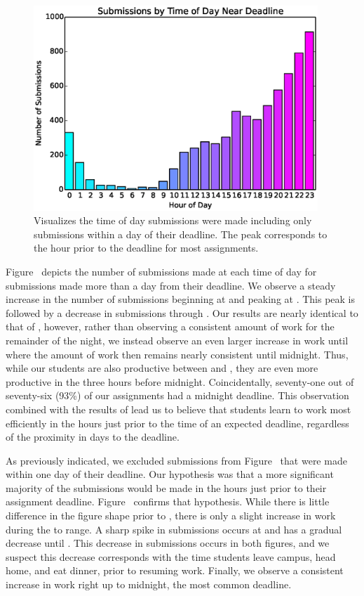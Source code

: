 \begin{figure}[!t]
\centering
\includegraphics[trim=0 .12in 0 .10in, clip, width=4.215in]{graphs/Submissions_by_Time_of_Day_Near_Deadline.eps}
\caption{Visualizes the time of day submissions were made including only
  submissions within a day of their deadline. The  peak corresponds to
  the hour prior to the deadline for most assignments.}
\end{figure}

Figure~ depicts the number of submissions made at
each time of day for submissions made more than a day from their deadline. We
observe a steady increase in the number of submissions beginning at  and
peaking at . This peak is followed by a decrease in submissions through
. Our results are nearly identical to that of \spacco{}, however, rather
than observing a consistent amount of work for the remainder of the night, we
instead observe an even larger increase in work until  where the amount
of work then remains nearly consistent until midnight. Thus, while our students
are also productive between  and , they are even more productive in
the three hours before midnight. Coincidentally, seventy-one out of seventy-six
(93\%) of our assignments had a midnight deadline. This observation combined
with the results of \spacco{} lead us to believe that students learn to work
most efficiently in the hours just prior to the time of an expected deadline,
regardless of the proximity in days to the deadline.

As previously indicated, we excluded submissions from
Figure~ that were made within one day of their
deadline. Our hypothesis was that a more significant majority of the
submissions would be made in the hours just prior to their assignment
deadline. Figure~ confirms that hypothesis. While
there is little difference in the figure shape prior to , there is only
a slight increase in work during the  to  range. A sharp spike in
submissions occurs at  and has a gradual decrease until . This
decrease in submissions occurs in both figures, and we suspect this decrease
corresponds with the time students leave campus, head home, and eat dinner,
prior to resuming work. Finally, we observe a consistent increase in work right
up to midnight, the most common deadline.

